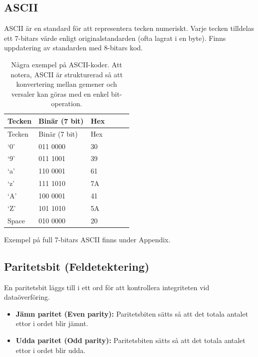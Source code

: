 \documentclass[
  swedish,
  letterpaper,
  oneside,
  openany]{book}
\providecommand{\tightlist}{%
  \setlength{\itemsep}{0pt}\setlength{\parskip}{0pt}}
\begin{document}
\subsection{ASCII}\label{ascii}

ASCII är en standard för att representera tecken numeriskt. Varje tecken
tilldelas ett 7-bitars värde enligt originalstandarden (ofta lagrat i en
byte). Finns uppdatering av standarden med 8-bitars kod.

\begin{longtable}[]{@{}llllll@{}}
\caption{Några exempel på ASCII-koder. Att notera, ASCII är strukturerad
så att konvertering mellan gemener och versaler kan göras med en enkel
bit-operation.}\label{tbl-ascii}\tabularnewline
\toprule\noalign{}
Tecken & Binär (7 bit) & Hex & & & \\
\midrule\noalign{}
\endfirsthead
\toprule\noalign{}
Tecken & Binär (7 bit) & Hex & & & \\
\midrule\noalign{}
\endhead
\bottomrule\noalign{}
\endlastfoot
`0' & 011 0000 & 30 & & & \\
`9' & 011 1001 & 39 & & & \\
`a' & 110 0001 & 61 & & & \\
`z' & 111 1010 & 7A & & & \\
`A' & 100 0001 & 41 & & & \\
`Z' & 101 1010 & 5A & & & \\
Space & 010 0000 & 20 & & & \\
\end{longtable}

Exempel på full 7-bitars ASCII finns under Appendix.

\subsection{Paritetsbit
(Feldetektering)}\label{paritetsbit-feldetektering}

En paritetsbit läggs till i ett ord för att kontrollera integriteten vid
dataöverföring.

\begin{itemize}
\tightlist
\item
  \textbf{Jämn paritet (Even parity):} Paritetsbiten sätts så att det
  totala antalet ettor i ordet blir jämnt.
\item
  \textbf{Udda paritet (Odd parity):} Paritetsbiten sätts så att det
  totala antalet ettor i ordet blir udda.
\end{itemize}
\end{document}
